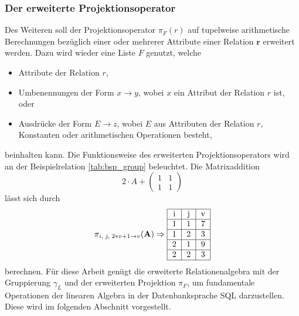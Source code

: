 \subsubsection*{Der erweiterte Projektionsoperator}
Des Weiteren soll der Projektionsoperator $\pi_F(r)$ auf tupelweise arithmetische Berechnungen bezüglich einer oder mehrerer Attribute einer Relation $\mathbf{r}$ erweitert werden. Dazu wird wieder eine Liste $F$ genutzt, welche 
\begin{itemize}
    \item Attribute der Relation $r$,
    \item Umbenennungen der Form $x \rightarrow y$, wobei $x$ ein Attribut der Relation $r$ ist, oder
    \item Ausdrücke der Form $E \rightarrow z$, wobei $E$ aus Attributen der Relation $r$, Konstanten oder arithmetischen Operationen besteht,
\end{itemize}
beinhalten kann. Die Funktionsweise des erweiterten Projektionsoperators wird an der Beispielrelation \ref{tab:bsp_group} beleuchtet. Die Matrixaddition
\begin{equation*}
    2 \cdot A + \begin{pmatrix}
        1 & 1\\
        1 &1
    \end{pmatrix}
\end{equation*}
lässt sich durch
\begin{equation*}
    \pi_{i,\; j, \; 2*v+1 \rightarrow v}(\mathbf{A}) \Rightarrow
    \begin{tabular}{|c|c|c|} \hline
        i &j &v\\
        \hline
        1 &1 &7\\
        \hline
        1 &2 &3\\
        \hline
        2 &1 &9\\
        \hline
        2 &2 &3\\
        \hline
    \end{tabular}
\end{equation*}
berechnen. Für diese Arbeit genügt die erweiterte Relationenalgebra mit der Gruppierung $\gamma_L$ und der erweiterten Projektion $\pi_F$, um fundamentale Operationen der linearen Algebra in der Datenbanksprache SQL darzustellen. Diese wird im folgenden Abschnitt vorgestellt.
